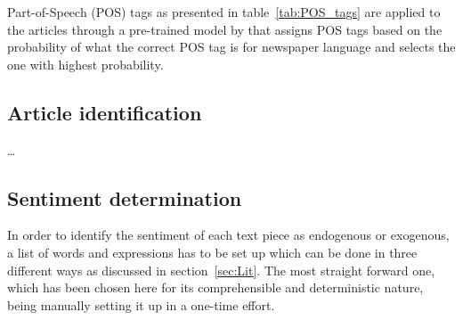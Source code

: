 
Part-of-Speech (POS) tags as presented in table~\vref{tab:POS_tags} are applied to the articles through a pre-trained model by \textcite{OpenNLP.2016} that assigns POS tags based on the probability of what the correct POS tag is for newspaper language and selects the one with highest probability.


\subsection{Article identification}

\dots 

\subsection{Sentiment determination}

In order to identify the sentiment of each text piece as endogenous or exogenous, a list of words and expressions has to be set up which can be done in three different ways as discussed in section~\ref{sec:Lit}. The most straight forward one, which has been chosen here for its comprehensible and deterministic nature, being manually setting it up in a one-time effort. 






